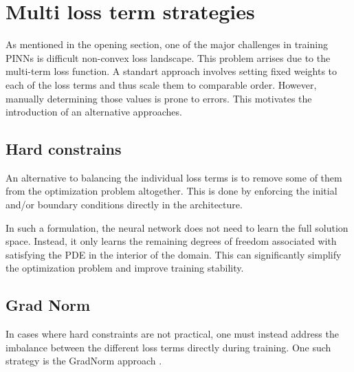 %


\section{Multi loss term strategies}

As mentioned in the opening section, one of the major challenges in training PINNs is difficult non-convex loss landscape.
This problem arrises due to the multi-term loss function.
A standart approach involves setting fixed weights to each of the loss terms and thus scale them to comparable order.
However, manually determining those values is prone to errors.
This motivates the introduction of an alternative approaches.

\subsection{Hard constrains}
An alternative to balancing the individual loss terms is to remove some of them from the optimization problem altogether.
This is done by enforcing the initial and/or boundary conditions directly in the architecture.

In such a formulation, the neural network does not need to learn the full solution space.
Instead, it only learns the remaining degrees of freedom associated with satisfying the PDE in the interior of the domain.
This can significantly simplify the optimization problem and improve training stability.\cite{comprehensive_analysis}


\subsection{Grad Norm}
In cases where hard constraints are not practical, one must instead address the imbalance between the different loss terms directly during training.
One such strategy is the GradNorm approach \cite{experts_guide}.

